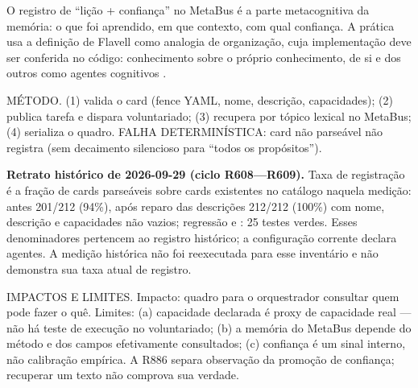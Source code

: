 O registro de ``lição + confiança'' no MetaBus é a parte metacognitiva da
memória: o que foi aprendido, em que contexto, com qual confiança. A prática
usa a definição de Flavell como analogia de organização, cuja implementação
deve ser conferida no código: conhecimento sobre o próprio conhecimento, de si e dos outros como
agentes cognitivos .\begin{metodo}
MÉTODO. (1)  valida o card (fence YAML, nome, descrição,
capacidades); (2)  publica tarefa e dispara voluntariado; (3)
 recupera por tópico lexical no MetaBus; (4)
 serializa o quadro. FALHA DETERMINÍSTICA: card não
parseável não registra (sem decaimento silencioso para ``todos os
propósitos'').
\end{metodo}

\begin{resultado}
\textbf{Retrato histórico de 2026-09-29 (ciclo R608—R609).}
Taxa de registração é a fração de cards parseáveis sobre
cards existentes no catálogo naquela medição:
antes 201/212 (94\%), após reparo das descrições 212/212 (100\%) com nome,
descrição e capacidades não vazios; regressão  e
: 25 testes verdes.
Esses denominadores pertencem ao registro histórico; a configuração corrente
declara \CoreAgentCount{} agentes. A medição histórica não foi reexecutada
para esse inventário e não demonstra sua taxa atual de registro.
\end{resultado}

\begin{limite}
IMPACTOS E LIMITES. Impacto: quadro para o orquestrador consultar
quem pode fazer o quê. Limites: (a) capacidade declarada é proxy de
capacidade real — não há teste de execução no voluntariado; (b) a memória do
MetaBus depende do método e dos campos efetivamente consultados; (c)
confiança é um sinal interno, não calibração empírica. A R886 separa
observação da promoção de confiança; recuperar um texto não comprova sua verdade.
\end{limite}

